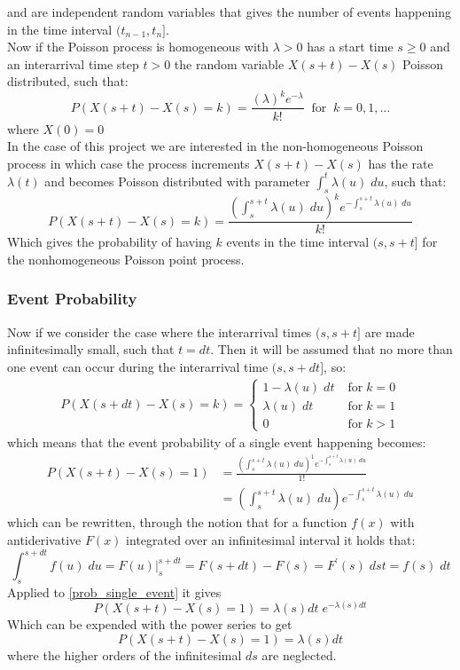 and are independent random variables that gives the number of events happening in the time interval $(t_{n-1}, t_n]$. 
\\
Now if the Poisson process is homogeneous with $\lambda > 0$ has a start time $s \ge 0$ and an interarrival time step $t > 0$ the random variable $X(s+t) - X(s)$ Poisson distributed, such that:
$$
P(X(s+t) - X(s) = k) = \frac{(\lambda)^k e^{-\lambda}}{k!} \;\; \text{for} \;\; k=0,1,\dots
$$
where $X(0) = 0$
\\
In the case of this project we are interested in the non-homogeneous Poisson process in which case the process increments $X(s+t) - X(s)$ has the rate $\lambda(t)$ and becomes Poisson distributed with parameter $\int_s^t \lambda(u) %
\; du$, such that:
$$
P(X(s+t) - X(s) = k) = \frac{\left(\int_s^{s+t} \lambda(u) \; du \right)^k e^{-\int_s^{s+t} \lambda(u) \; du}}{k!}
$$
Which gives the probability of having $k$ events in the time interval $(s, s+t]$ for the nonhomogeneous Poisson point process.

\subsubsection{Event Probability}
\label{sec:Method:Possion:EventProbability}
Now if we consider the case where the interarrival times $(s, s+t]$ are made infinitesimally small, such that $t = dt$. Then it will be assumed that no more than one event can occur during the interarrival time $(s, s+dt]$, so:
\begin{align}
P(X(s+dt) - X(s) = k) = 
\begin{cases}
1 - \lambda(u) \; dt \; &\text{for} \; k=0 \\
\lambda(u) \; dt \; &\text{for} \; k=1 \\
0 \; &\text{for} \; k > 1
\end{cases}
\end{align}
which means that the event probability of a single event happening becomes:
\begin{align}
P(X(s+t) - X(s) = 1) &= \frac{\left(\int_s^{s+t} \lambda(u) \; du \right)^1 e^{-\int_s^{s+t} \lambda(u) \; du}}{1!} \\
&= \left(\int_s^{s+t} \lambda(u) \; du \right) e^{-\int_s^{s+t} \lambda(u) \; du}\label{prob_single_event}
\end{align}
which can be rewritten, through the notion that for a function $f(x)$ with antiderivative $F(x)$ integrated over an infinitesimal interval it holds that:
$$
\int_s^{s+dt} f(u) \; du = F(u) \rvert_s^{s+dt} = F(s+dt) - F(s) = F^{\prime}(s) \; dst = f(s) \; dt
$$
Applied to \ref{prob_single_event} it gives
$$
P(X(s+t) - X(s) = 1) = \lambda(s)dt \; e^{-\lambda(s)dt}
$$
Which can be expended with the power series to get
$$
P(X(s+t) - X(s) = 1) = \lambda(s) dt
$$
where the higher orders of the infinitesimal $ds$ are neglected.


